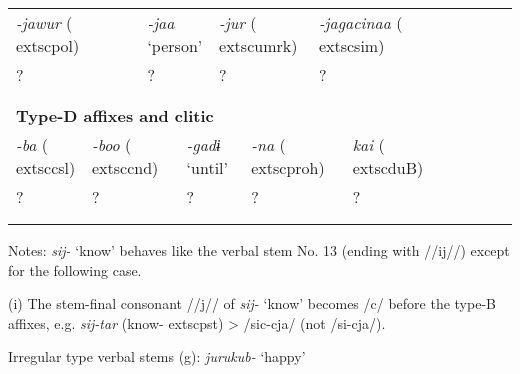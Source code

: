 \begin{tabularx}{\textwidth}{XXXXXXXXXXXXXXXXXXXXXX}
\multicolumn{4}{X}{{ \textit{{}-jawur} (	extsc{pol})}} & \multicolumn{3}{X}{{ \textit{{}-jaa} ‘person’}} & \multicolumn{5}{X}{{ \textit{{}-jur} (	extsc{umrk})}} & \multicolumn{4}{X}{{ \textit{{}-jagacinaa} (	extsc{sim})}} & \multicolumn{6}{X}{}\\
\multicolumn{4}{X}{{ ?}} & \multicolumn{3}{X}{?} & \multicolumn{5}{X}{?} & \multicolumn{4}{X}{{ ?}} & \multicolumn{6}{X}{}\\
\multicolumn{4}{X}{} & \multicolumn{3}{X}{} & \multicolumn{5}{X}{} & \multicolumn{4}{X}{} & \multicolumn{6}{X}{}\\
\multicolumn{22}{X}{}\\
\multicolumn{22}{X}{{\bfseries Type-D affixes and clitic}}\\
\multicolumn{2}{X}{{ \textit{{}-ba} (	extsc{csl})}} & \multicolumn{3}{X}{{ \textit{{}-boo} (	extsc{cnd})}} & \multicolumn{4}{X}{{ \textit{{}-gadɨ} ‘until’}} & \multicolumn{4}{X}{{ \textit{{}-na} (	extsc{proh})}} & \multicolumn{4}{X}{{ \textit{kai} (	extsc{du}B)}} & \multicolumn{5}{X}{}\\
\multicolumn{2}{X}{?} & \multicolumn{3}{X}{{ ?}} & \multicolumn{4}{X}{{ ?}} & \multicolumn{4}{X}{{ ?}} & \multicolumn{4}{X}{{ ?}} & \multicolumn{5}{X}{}\\
\multicolumn{2}{X}{} & \multicolumn{3}{X}{} & \multicolumn{4}{X}{} & \multicolumn{4}{X}{} & \multicolumn{4}{X}{} & \multicolumn{5}{X}{}\\
\lspbottomrule
\end{tabularx}
Notes: \textit{sij-} ‘know’ behaves like the verbal stem No. 13 (ending with //ij//) except for the following case.

(i)  The stem-final consonant //j// of \textit{sij-} ‘know’ becomes /c/ before the type-B affixes, e.g. \textit{sij-tar} (know-	extsc{pst}) > /sic-cja/ (not /si-cja/).

Irregular type verbal stems (g): \textit{jurukub-} ‘happy’

\tablefirsthead{}

